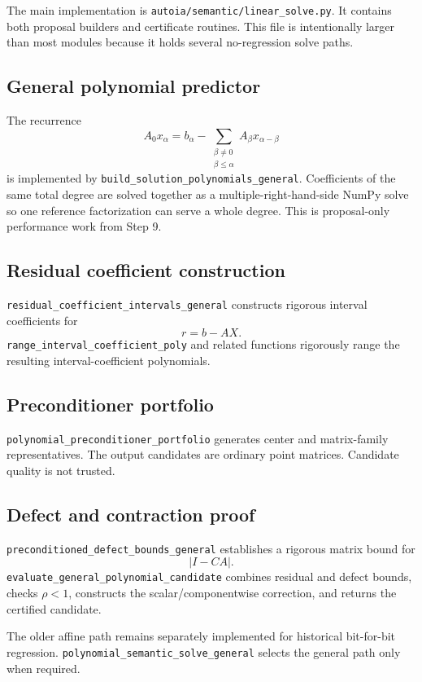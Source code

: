 \documentclass[11pt]{article}
\newcommand{\codepath}[1]{\nolinkurl{#1}}
\begin{document}
The main implementation is
\codepath{autoia/semantic/linear_solve.py}.  It contains both proposal builders
and certificate routines.  This file is intentionally larger than most modules
because it holds several no-regression solve paths.

\subsection{General polynomial predictor}

The recurrence
\[
  A_0x_\alpha=b_\alpha-
  \sum_{\substack{\beta\ne0\\\beta\le\alpha}}
  A_\beta x_{\alpha-\beta}
\]
is implemented by
\texttt{build\_solution\_polynomials\_general}.  Coefficients of the same total
degree are solved together as a multiple-right-hand-side NumPy solve so one
reference factorization can serve a whole degree.  This is proposal-only
performance work from Step 9.

\subsection{Residual coefficient construction}

\texttt{residual\_coefficient\_intervals\_general} constructs rigorous interval
coefficients for
\[
  r=b-AX.
\]
\texttt{range\_interval\_coefficient\_poly} and related functions rigorously
range the resulting interval-coefficient polynomials.

\subsection{Preconditioner portfolio}

\texttt{polynomial\_preconditioner\_portfolio} generates center and matrix-family
representatives.  The output candidates are ordinary point matrices.  Candidate
quality is not trusted.

\subsection{Defect and contraction proof}

\texttt{preconditioned\_defect\_bounds\_general} establishes a rigorous matrix
bound for
\[
  |I-CA|.
\]
\texttt{evaluate\_general\_polynomial\_candidate} combines residual and defect
bounds, checks \(\rho<1\), constructs the scalar/componentwise correction, and
returns the certified candidate.

The older affine path remains separately implemented for historical bit-for-bit
regression.  \texttt{polynomial\_semantic\_solve\_general} selects the general
path only when required.
\end{document}
